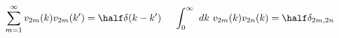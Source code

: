 \begin{equation}\sum_{m=1}^\infty v_{2m}(k)v_{2m}(k')=\half\delta(k-k')\
\ \ \ \int_0^\infty \ dk\
v_{2m}(k)v_{2n}(k)=\half\delta_{2m,2n}\label{eq:vprop2}\end{equation}

